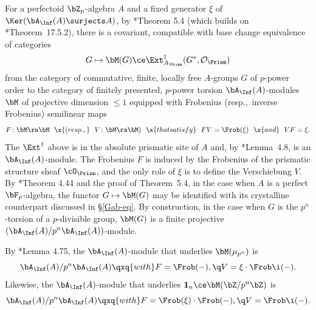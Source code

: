  \label{pp:prismatic-review}\label{thm:dieudonne}
For a perfectoid $\bZ_p$-algebra $A$ and a fixed generator $\xi$ of $\Ker(\bA_\Inf(A) \surjects A)$, by \cite{ALB20}*{Theorem 5.4} (which builds on \cite{SW19}*{Theorem~17.5.2}), there is a covariant, compatible with base change %
equivalence of categories
\[
G \mapsto \bM(G) \ce \Ext^1_{A_\Prism}(G^*, \mathcal O_\Prism)
\]
from the category of commutative, finite, locally free $A$-groups $G$ of $p$-power order to the category of finitely presented, $p$-power torsion $\bA_\Inf(A)$-modules $\bM$ of projective dimension $\le 1$ equipped with Frobenius (resp.,~inverse Frobenius) semilinear maps
\[
F \colon \bM \ra \bM \ \ \x{(resp.,}\ \ V \colon \bM \ra \bM) \ \ \x{that satisfy} \ \ FV = \Frob(\xi) \ \ \x{and}\ \ VF = \xi.
\]
The $\Ext^1$ above is in the absolute prismatic site of $A$ %
and, by \cite{BS19}*{Lemma~4.8}, is an $\bA_\Inf(A)$-module. The Frobenius $F$ is induced by the Frobenius of the prismatic structure sheaf $\cO_{\Prism}$, and the only role of $\xi$ is to define the Verschiebung $V$. By \cite{ALB20}*{Theorem 4.44 and the proof of Theorem~5.4}, in the case when $A$ is a perfect $\bF_p$-algebra, %
the functor $G \mapsto \bM(G)$ may be identified with its crystalline counterpart discussed in \S\ref{Gab-eq}. %
By construction, in the case when $G$ is the $p^n$-torsion of a $p$-divisible group, $\bM(G)$ is a finite projective $(\bA_\Inf(A)/p^n\bA_\Inf(A))$-module.
\epp


\beg \label{explicit-M(G)}
By \cite{ALB20}*{Lemma 4.75}, the $\bA_\Inf(A)$-module that underlies $\bM(\mu_{p^n})$ is %
\[
\bA_\Inf(A)/p^n\bA_\Inf(A) \qxq{with} F = \Frob(-),\q V = \xi\cdot\Frob\i(-).
\]
Likewise, %
the $\bA_\Inf(A)$-module that underlies ${\mathbf{1}}_n \ce \bM(\bZ/p^n\bZ)$ is
\[
\bA_\Inf(A)/p^n\bA_\Inf(A) \qxq{with} F = \Frob(\xi)\cdot\Frob(-), \q V = \Frob\i(-).
\]
\eeg




